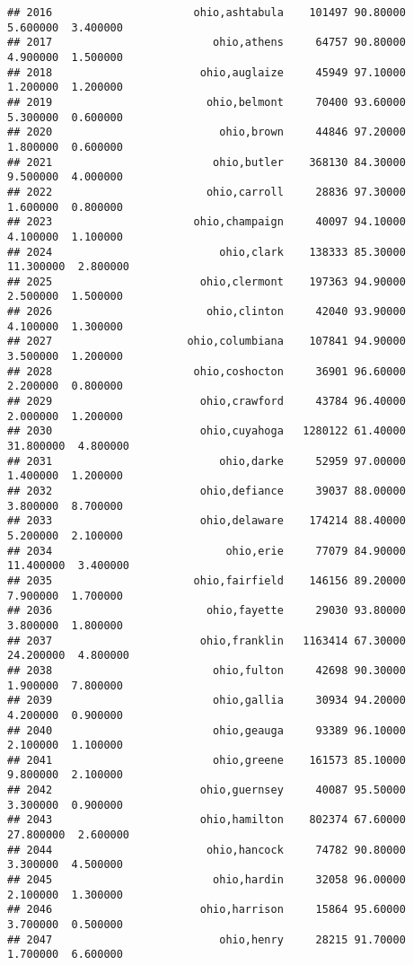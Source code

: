 \documentclass[
]{article}
\begin{document}
\begin{verbatim}
## 2016                      ohio,ashtabula    101497 90.80000  5.600000  3.400000
## 2017                         ohio,athens     64757 90.80000  4.900000  1.500000
## 2018                       ohio,auglaize     45949 97.10000  1.200000  1.200000
## 2019                        ohio,belmont     70400 93.60000  5.300000  0.600000
## 2020                          ohio,brown     44846 97.20000  1.800000  0.600000
## 2021                         ohio,butler    368130 84.30000  9.500000  4.000000
## 2022                        ohio,carroll     28836 97.30000  1.600000  0.800000
## 2023                      ohio,champaign     40097 94.10000  4.100000  1.100000
## 2024                          ohio,clark    138333 85.30000 11.300000  2.800000
## 2025                       ohio,clermont    197363 94.90000  2.500000  1.500000
## 2026                        ohio,clinton     42040 93.90000  4.100000  1.300000
## 2027                     ohio,columbiana    107841 94.90000  3.500000  1.200000
## 2028                      ohio,coshocton     36901 96.60000  2.200000  0.800000
## 2029                       ohio,crawford     43784 96.40000  2.000000  1.200000
## 2030                       ohio,cuyahoga   1280122 61.40000 31.800000  4.800000
## 2031                          ohio,darke     52959 97.00000  1.400000  1.200000
## 2032                       ohio,defiance     39037 88.00000  3.800000  8.700000
## 2033                       ohio,delaware    174214 88.40000  5.200000  2.100000
## 2034                           ohio,erie     77079 84.90000 11.400000  3.400000
## 2035                      ohio,fairfield    146156 89.20000  7.900000  1.700000
## 2036                        ohio,fayette     29030 93.80000  3.800000  1.800000
## 2037                       ohio,franklin   1163414 67.30000 24.200000  4.800000
## 2038                         ohio,fulton     42698 90.30000  1.900000  7.800000
## 2039                         ohio,gallia     30934 94.20000  4.200000  0.900000
## 2040                         ohio,geauga     93389 96.10000  2.100000  1.100000
## 2041                         ohio,greene    161573 85.10000  9.800000  2.100000
## 2042                       ohio,guernsey     40087 95.50000  3.300000  0.900000
## 2043                       ohio,hamilton    802374 67.60000 27.800000  2.600000
## 2044                        ohio,hancock     74782 90.80000  3.300000  4.500000
## 2045                         ohio,hardin     32058 96.00000  2.100000  1.300000
## 2046                       ohio,harrison     15864 95.60000  3.700000  0.500000
## 2047                          ohio,henry     28215 91.70000  1.700000  6.600000

\end{verbatim}
\end{document}
